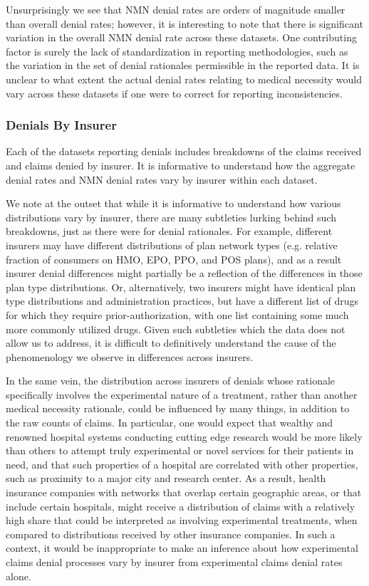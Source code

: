 \documentclass[12pt, a4paper,twoside,parskip=full]{report}
\theoremstyle{plain} %
\theoremstyle{definition} %
\theoremstyle{remark} %
\numberwithin{equation}{chapter}
\begin{document}
		
		Unsurprisingly we see that NMN denial rates are orders of magnitude smaller than overall denial rates; however, it is interesting to note that there is significant variation in the overall NMN denial rate across these datasets. One contributing factor is surely the lack of standardization in reporting methodologies, such as the variation in the set of denial rationales permissible in the reported data. It is unclear to what extent the actual denial rates relating to medical necessity would vary across these datasets if one were to correct for reporting inconsistencies. \\
		
		
		\subsubsection{Denials By Insurer}
		
		Each of the datasets reporting denials includes breakdowns of the claims received and claims denied by insurer. It is informative to understand how the aggregate denial rates and NMN denial rates vary by insurer within each dataset.
		
		We note at the outset that while it is informative to understand how various distributions vary by insurer, there are many subtleties lurking behind such breakdowns, just as there were for denial rationales. For example, different insurers may have different distributions of plan network types (e.g. relative fraction of consumers on HMO, EPO, PPO, and POS plans), and as a result insurer denial differences might partially be a reflection of the differences in those plan type distributions. Or, alternatively, two insurers might have identical plan type distributions and administration practices, but have a different list of drugs for which they require prior-authorization, with one list containing some much more commonly utilized drugs. Given such subtleties which the data does not allow us to address, it is difficult to definitively understand the cause of the phenomenology we observe in differences across insurers.
		
		In the same vein, the distribution across insurers of denials whose rationale specifically involves the experimental nature of a treatment, rather than another medical necessity rationale, could be influenced by many things, in addition to the raw counts of claims. In particular, one would expect that wealthy and renowned hospital systems conducting cutting edge research would be more likely than others to attempt truly experimental or novel services for their patients in need, and that such properties of a hospital are correlated with other properties, such as proximity to a major city and research center. As a result, health insurance companies with networks that overlap certain geographic areas, or that include certain hospitals, might receive a distribution of claims with a relatively high share that could be interpreted as involving experimental treatments, when compared to distributions received by other insurance companies. In such a context, it would be inappropriate to make an inference about how experimental claims denial processes vary by insurer from experimental claims denial rates alone.
		
\end{document}
